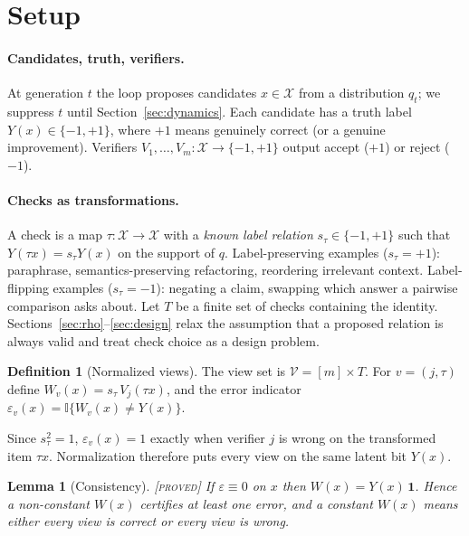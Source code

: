 \documentclass[11pt]{article}
\newtheorem{lemma}{Lemma}
\theoremstyle{definition}
\newtheorem{definition}{Definition}
\theoremstyle{remark}
\newcommand{\status}[1]{\hfill{\normalfont\small\textsc{[#1]}}}
\newcommand{\cV}{\mathcal{V}}
\newcommand{\one}{\mathbf{1}}
\begin{document}
\section{Setup}

\paragraph{Candidates, truth, verifiers.} At generation $t$ the loop proposes candidates $x\in\mathcal{X}$ from a distribution $q_t$; we suppress $t$ until Section~\ref{sec:dynamics}. Each candidate has a truth label $Y(x)\in\{-1,+1\}$, where $+1$ means genuinely correct (or a genuine improvement). Verifiers $V_1,\dots,V_m:\mathcal{X}\to\{-1,+1\}$ output accept ($+1$) or reject ($-1$).

\paragraph{Checks as transformations.} A check is a map $\tau:\mathcal{X}\to\mathcal{X}$ with a \emph{known label relation} $s_\tau\in\{-1,+1\}$ such that $Y(\tau x)=s_\tau Y(x)$ on the support of $q$. Label-preserving examples ($s_\tau=+1$): paraphrase, semantics-preserving refactoring, reordering irrelevant context. Label-flipping examples ($s_\tau=-1$): negating a claim, swapping which answer a pairwise comparison asks about. Let $T$ be a finite set of checks containing the identity. Sections~\ref{sec:rho}--\ref{sec:design} relax the assumption that a proposed relation is always valid and treat check choice as a design problem.

\begin{definition}[Normalized views]
The view set is $\cV=[m]\times T$. For $v=(j,\tau)$ define $W_v(x)=s_\tau\,V_j(\tau x)$, and the error indicator $\varepsilon_v(x)=\mathbb{I}\{W_v(x)\neq Y(x)\}$.
\end{definition}

Since $s_\tau^2=1$, $\varepsilon_v(x)=1$ exactly when verifier $j$ is wrong on the transformed item $\tau x$. Normalization therefore puts every view on the same latent bit $Y(x)$.

\begin{lemma}[Consistency]\label{lem:consistency}\status{proved}
If $\varepsilon\equiv 0$ on $x$ then $W(x)=Y(x)\,\one$. Hence a non-constant $W(x)$ certifies at least one error, and a constant $W(x)$ means either every view is correct or every view is wrong.
\end{lemma}
\end{document}
